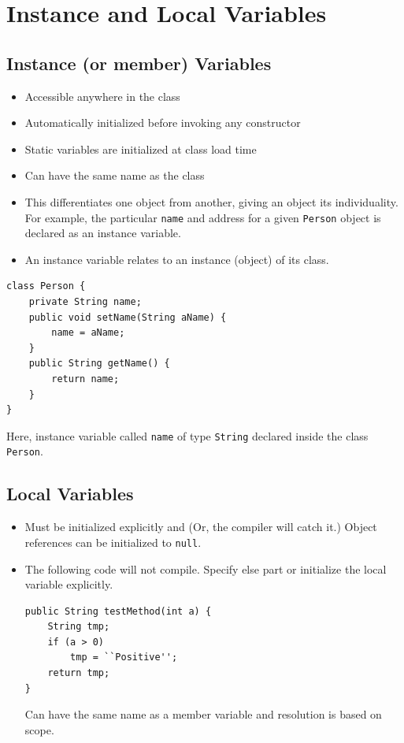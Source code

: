 \documentclass[11pt,a4paper]{article}
\begin{document}
\section*{Instance and Local Variables}
\subsection*{Instance (or member) Variables}
\begin{itemize}
\item Accessible anywhere in the class
\item Automatically initialized before invoking any constructor
\item Static variables are initialized at class load time
\item Can have the same name as the class
\item This differentiates one object from another, giving an object its individuality. For example, the particular \texttt{name} and address for a given \texttt{Person} object is declared as an instance variable.
\item An instance variable relates to an instance (object) of its class.

\end{itemize}
\begin{lstlisting}[numbers=none, xleftmargin=.25in]
class Person {
    private String name;
    public void setName(String aName) {
        name = aName;
    }
    public String getName() {
        return name;
    }
}
\end{lstlisting}
Here, instance variable called \texttt{name} of type \texttt{String} declared inside the class \texttt{Person}.
\subsection*{Local Variables}
\begin{itemize}
\item Must be initialized explicitly and (Or, the compiler will catch it.) Object references can be initialized to \texttt{null}.

\item The following code will not compile. Specify else part or initialize the local variable explicitly.
\begin{lstlisting}[numbers=none, xleftmargin=.25in]
public String testMethod(int a) {
    String tmp;
    if (a > 0)
        tmp = ``Positive'';
    return tmp;
}
\end{lstlisting}
Can have the same name as a member variable and resolution is based on scope.
\end{itemize}
 
 
\end{document}
